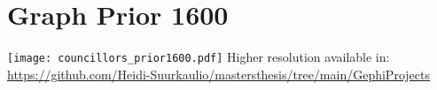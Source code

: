 \section{Graph Prior 1600}
\texttt{[image: councillors\_prior1600.pdf]}
Higher resolution available in: \url{https://github.com/Heidi-Suurkaulio/mastersthesis/tree/main/GephiProjects}